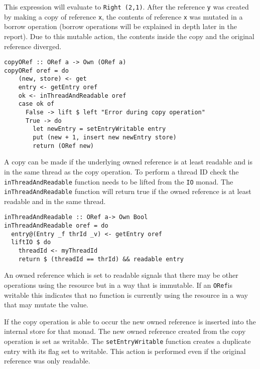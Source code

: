 \documentclass[onehalf,11pt]{beavtex}
\begin{document}
This expression will evaluate to \texttt{Right (2,1)}.
After the reference \texttt{y} was created by making a copy of
reference \texttt{x}, the contents of reference \texttt{x}
was mutated in a borrow operation (borrow operations will be explained in depth
later in the report).
Due to this mutable action, the contents inside the copy and the original
reference diverged.

\begin{verbatim}
copyORef :: ORef a -> Own (ORef a)
copyORef oref = do
    (new, store) <- get
    entry <- getEntry oref
    ok <- inThreadAndReadable oref
    case ok of
      False -> lift $ left "Error during copy operation"
      True -> do
        let newEntry = setEntryWritable entry
        put (new + 1, insert new newEntry store)
        return (ORef new)
\end{verbatim}

A copy can be made if the underlying owned reference is at least readable and
is in the same thread as the copy operation.
To perform a thread ID check the \texttt{inThreadAndReadable} function
needs to be lifted from the \texttt{IO} monad.
The \texttt{inThreadAndReadable} function will return true if the owned reference
is at least readable and in the same thread.

\begin{verbatim}
inThreadAndReadable :: ORef a-> Own Bool
inThreadAndReadable oref = do
  entry@(Entry _f thrId _v) <- getEntry oref
  liftIO $ do
    threadId <- myThreadId
    return $ (threadId == thrId) && readable entry
\end{verbatim}

An owned reference which is set to readable signals that there may be other
operations using the resource but in a way that is immutable.
If an \texttt{ORef}is writable this indicates that no function is currently using the
resource in a way that may mutate the value.

If the copy operation is able to occur the new owned reference is inserted into
the internal store for that monad.  The new owned reference created from the copy
operation is set as writable. The \texttt{setEntryWritable} function
creates a duplicate entry with its flag set to writable.
This action is performed even if the original reference was only
readable.
\end{document}

